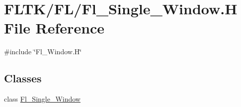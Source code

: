 \hypertarget{_fl___single___window_8_h}{}\section{F\+L\+T\+K/\+F\+L/\+Fl\+\_\+\+Single\+\_\+\+Window.H File Reference}
\label{_fl___single___window_8_h}
{\ttfamily \#include \char`\"{}Fl\+\_\+\+Window.\+H\char`\"{}}\newline
\subsection*{Classes}
\begin{DoxyCompactItemize}
\item 
class \hyperlink{class_fl___single___window}{Fl\+\_\+\+Single\+\_\+\+Window}
\end{DoxyCompactItemize}
